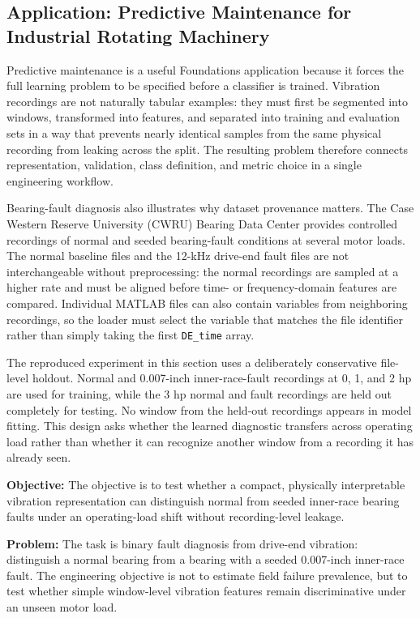 \subsection{Application: Predictive Maintenance for Industrial Rotating Machinery}

Predictive maintenance is a useful Foundations application because it forces the full learning problem to be specified before a classifier is trained. Vibration recordings are not naturally tabular examples: they must first be segmented into windows, transformed into features, and separated into training and evaluation sets in a way that prevents nearly identical samples from the same physical recording from leaking across the split. The resulting problem therefore connects representation, validation, class definition, and metric choice in a single engineering workflow.

Bearing-fault diagnosis also illustrates why dataset provenance matters. The Case Western Reserve University (CWRU) Bearing Data Center provides controlled recordings of normal and seeded bearing-fault conditions at several motor loads. The normal baseline files and the 12-kHz drive-end fault files are not interchangeable without preprocessing: the normal recordings are sampled at a higher rate and must be aligned before time- or frequency-domain features are compared. Individual MATLAB files can also contain variables from neighboring recordings, so the loader must select the variable that matches the file identifier rather than simply taking the first \texttt{DE\_time} array.

The reproduced experiment in this section uses a deliberately conservative file-level holdout. Normal and 0.007-inch inner-race-fault recordings at 0, 1, and 2 hp are used for training, while the 3 hp normal and fault recordings are held out completely for testing. No window from the held-out recordings appears in model fitting. This design asks whether the learned diagnostic transfers across operating load rather than whether it can recognize another window from a recording it has already seen.

\textbf{Objective:} The objective is to test whether a compact, physically interpretable vibration representation can distinguish normal from seeded inner-race bearing faults under an operating-load shift without recording-level leakage.

\textbf{Problem:} The task is binary fault diagnosis from drive-end vibration: distinguish a normal bearing from a bearing with a seeded 0.007-inch inner-race fault. The engineering objective is not to estimate field failure prevalence, but to test whether simple window-level vibration features remain discriminative under an unseen motor load.

